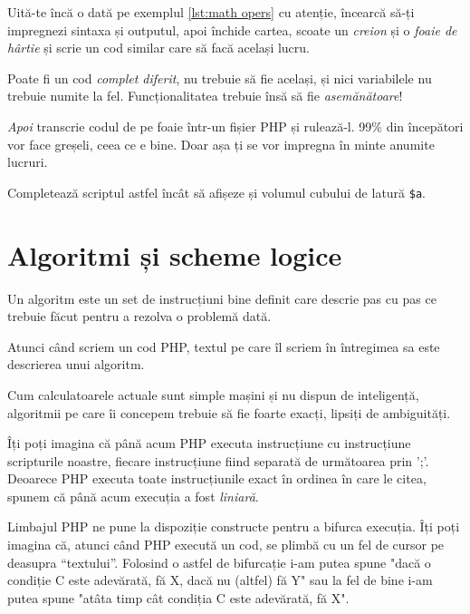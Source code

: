 \begin{Exercise}[difficulty=1,title={Primul pas spre creativitate}]
\ExePart
Uită-te încă o dată pe exemplul \ref{lst:math opers} cu atenție,
încearcă să-ți impregnezi sintaxa și outputul, apoi închide
cartea, scoate un \textit{creion} și o \textit{foaie de hârtie}
și scrie un cod similar care să facă același lucru.

Poate fi un cod \textit{complet diferit}, nu trebuie să fie același,
și nici variabilele nu trebuie numite la fel. Funcționalitatea
trebuie însă să fie \textit{asemănătoare}!

\textit{Apoi} transcrie codul de pe foaie într-un fișier
PHP și rulează-l. 99\% din începători vor face greșeli,
ceea ce e bine. Doar așa ți se vor impregna în minte anumite lucruri.

\ExePart
Completează scriptul astfel încât să afișeze și volumul cubului
de latură \texttt{\$a}.
\end{Exercise}



\section{Algoritmi și scheme logice}
Un algoritm este un set de instrucțiuni bine definit
care descrie pas cu pas ce trebuie făcut pentru
a rezolva o problemă dată.

Atunci când scriem un cod PHP, textul pe care
îl scriem în întregimea sa este descrierea unui algoritm.

Cum calculatoarele actuale sunt simple mașini și nu
dispun de inteligență, algoritmii pe care îi concepem
trebuie să fie foarte exacți, lipsiți de ambiguități.

Îți poți imagina că până acum PHP executa instrucțiune
cu instrucțiune scripturile noastre, fiecare instrucțiune
fiind separată de următoarea prin ';'.
Deoarece PHP executa toate instrucțiunile exact în ordinea
în care le citea, spunem că până acum execuția a fost
\textit{liniară}.

Limbajul PHP ne pune la dispoziție constructe pentru a bifurca
execuția. Îți poți imagina că, atunci când PHP
execută un cod, se plimbă cu un fel de cursor
pe deasupra ``textului''. Folosind o astfel de bifurcație
i-am putea spune "dacă o condiție C este adevărată, fă
X, dacă nu (altfel) fă Y" sau la fel de bine
i-am putea spune "atâta timp cât condiția C
este adevărată, fă X".

